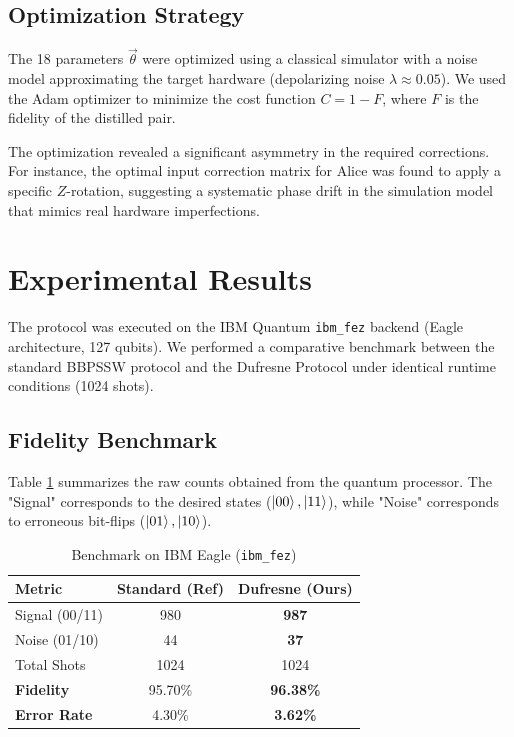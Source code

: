 \documentclass[twocolumn,aps,prl,superscriptaddress]{revtex4-2}
\begin{document}
\subsection{Optimization Strategy}
The 18 parameters $\vec{\theta}$ were optimized using a classical simulator with a noise model approximating the target hardware (depolarizing noise $\lambda \approx 0.05$). We used the Adam optimizer to minimize the cost function $C = 1 - F$, where $F$ is the fidelity of the distilled pair.

The optimization revealed a significant asymmetry in the required corrections. For instance, the optimal input correction matrix for Alice was found to apply a specific $Z$-rotation, suggesting a systematic phase drift in the simulation model that mimics real hardware imperfections.

\section{Experimental Results}

The protocol was executed on the IBM Quantum \texttt{ibm\_fez} backend (Eagle architecture, 127 qubits). We performed a comparative benchmark between the standard BBPSSW protocol and the Dufresne Protocol under identical runtime conditions (1024 shots).

\subsection{Fidelity Benchmark}
Table \ref{tab:results} summarizes the raw counts obtained from the quantum processor. The "Signal" corresponds to the desired states ($\ket{00}, \ket{11}$), while "Noise" corresponds to erroneous bit-flips ($\ket{01}, \ket{10}$).

\begin{table}[h]
\centering
\caption{Benchmark on IBM Eagle (\texttt{ibm\_fez})}
\label{tab:results}
\begin{tabular}{@{}lcc@{}}
\toprule
\textbf{Metric} & \textbf{Standard (Ref)} & \textbf{Dufresne (Ours)} \\ \midrule
Signal (00/11) & 980 & \textbf{987} \\
Noise (01/10) & 44 & \textbf{37} \\
Total Shots & 1024 & 1024 \\ \midrule
\textbf{Fidelity} & 95.70\% & \textbf{96.38\%} \\
\textbf{Error Rate} & 4.30\% & \textbf{3.62\%} \\ \bottomrule
\end{tabular}
\end{table}
\end{document}
